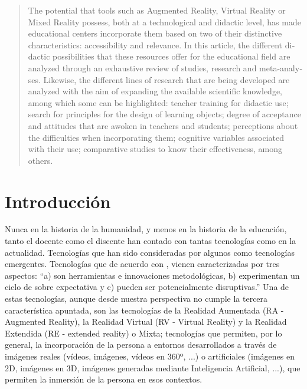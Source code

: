 \documentclass[spanish]{textolivre}
\begin{document}
\begin{polyabstract}
\begin{portuguese}
\begin{abstract}
\end{abstract}
\end{portuguese}

\begin{english}
\begin{abstract}
The potential that tools such as Augmented Reality, Virtual Reality or Mixed Reality possess, both at a technological and didactic level, has made educational centers incorporate them based on two of their distinctive characteristics: accessibility and relevance. In this article, the different didactic possibilities that these resources offer for the educational field are analyzed through an exhaustive review of studies, research and meta-analyses. Likewise, the different lines of research that are being developed are analyzed with the aim of expanding the available scientific knowledge, among which some can be highlighted: teacher training for didactic use; search for principles for the design of learning objects; degree of acceptance and attitudes that are awoken in teachers and students; perceptions about the difficulties when incorporating them; cognitive variables associated with their use; comparative studies to know their effectiveness, among others.

\end{abstract}
\end{english}
\end{polyabstract}

\section{Introducción}
Nunca en la historia de la humanidad, y menos en la historia de la educación, tanto el docente como el discente han contado con tantas tecnologías como en la actualidad. Tecnologías que han sido consideradas por algunos como tecnologías emergentes. Tecnologías que de acuerdo con \textcite[p.~13]{cabero_2023}, vienen caracterizadas por tres aspectos: “a) son herramientas e innovaciones metodológicas, b) experimentan un ciclo de sobre expectativa y c) pueden ser potencialmente disruptivas.” Una de estas tecnologías, aunque desde nuestra perspectiva no cumple la tercera característica apuntada, son las tecnologías de la Realidad Aumentada (RA - Augmented Reality), la Realidad Virtual (RV - Virtual Reality) y la Realidad Extendida (RE - extended reality) o Mixta; tecnologías que permiten, por lo general, la incorporación de la persona a entornos desarrollados a través de imágenes reales (vídeos, imágenes, vídeos en 360º, ...) o artificiales (imágenes en 2D, imágenes en 3D, imágenes generadas mediante Inteligencia Artificial, ...), que permiten la inmersión de la persona en esos contextos.
\end{document}

